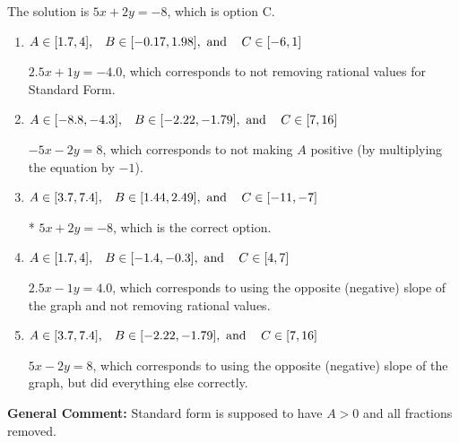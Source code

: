 \documentclass{extbook}[14pt]
\begin{document}
\begin{enumerate}
{The solution is \( 5x + 2y = -8 \), which is option C.\begin{enumerate}[label=\Alph*.]
\item \( A \in [1.7, 4], \hspace{3mm} B \in [-0.17, 1.98], \text{ and } \hspace{3mm} C \in [-6, 1] \)

 $2.5x + 1y = -4.0$, which corresponds to not removing rational values for Standard Form.
\item \( A \in [-8.8, -4.3], \hspace{3mm} B \in [-2.22, -1.79], \text{ and } \hspace{3mm} C \in [7, 16] \)

 $-5x - 2y = 8$, which corresponds to not making $A$ positive (by multiplying the equation by $-1$).
\item \( A \in [3.7, 7.4], \hspace{3mm} B \in [1.44, 2.49], \text{ and } \hspace{3mm} C \in [-11, -7] \)

* $5x + 2y = -8$, which is the correct option.
\item \( A \in [1.7, 4], \hspace{3mm} B \in [-1.4, -0.3], \text{ and } \hspace{3mm} C \in [4, 7] \)

 $2.5x - 1y = 4.0$, which corresponds to using the opposite (negative) slope of the graph and not removing rational values.
\item \( A \in [3.7, 7.4], \hspace{3mm} B \in [-2.22, -1.79], \text{ and } \hspace{3mm} C \in [7, 16] \)

 $5x - 2y = 8$, which corresponds to using the opposite (negative) slope of the graph, but did everything else correctly.
\end{enumerate}

\textbf{General Comment:} Standard form is supposed to have $A > 0$ and all fractions removed.
}
\end{enumerate}
\end{document}
